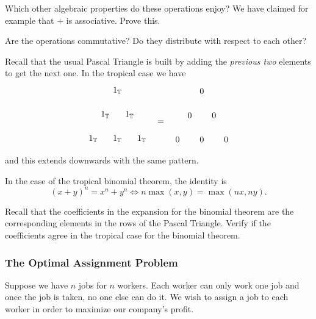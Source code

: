 \documentclass[12pt]{memoir}
\begin{document}
\begin{Ej}[2-]
Which other algebraic properties do these operations enjoy? We have claimed for example that $+$ is associative. Prove this.\par 
Are the operations commutative? Do they distribute with respect to each other?
\end{Ej}

\begin{Prop}
Recall that the usual Pascal Triangle is built by adding the \emph{previous two} elements to get the next one. In the tropical case we have 
$$
\begin{tikzpicture}
    \foreach \n in {0,...,2} {
      \foreach \k in {0,...,\n} {
        \node at (\k-\n/2,-\n) {$1_\bT$};
      }
    }
    \end{tikzpicture}
    \word{\raisebox{2.5em}{=}}%
    \begin{tikzpicture}
        \foreach \n in {0,...,2} {
          \foreach \k in {0,...,\n} {
            \node at (\k-\n/2,-\n) {$0$};
          }
        }
        \end{tikzpicture}
    $$
    and this extends downwards with the same pattern.\par 
    In the case of the tropical binomial theorem, the identity is
    $$(x+y)^n=x^n+y^n\iff n\max(x,y)=\max(nx,ny).$$
\end{Prop}

\begin{Ej}[2]
Recall that the coefficients in the expansion for the binomial theorem are the corresponding elements in the rows of the Pascal Triangle. Verify if the coefficients agree in the tropical case for the binomial theorem.
\end{Ej}


\subsubsection{The Optimal Assignment Problem}

Suppose we have $n$ jobs for $n$ workers. Each worker can only work one job and once the job is taken, no one else can do it. We wish to assign a job to each worker in order to maximize our company's profit.
\end{document}
